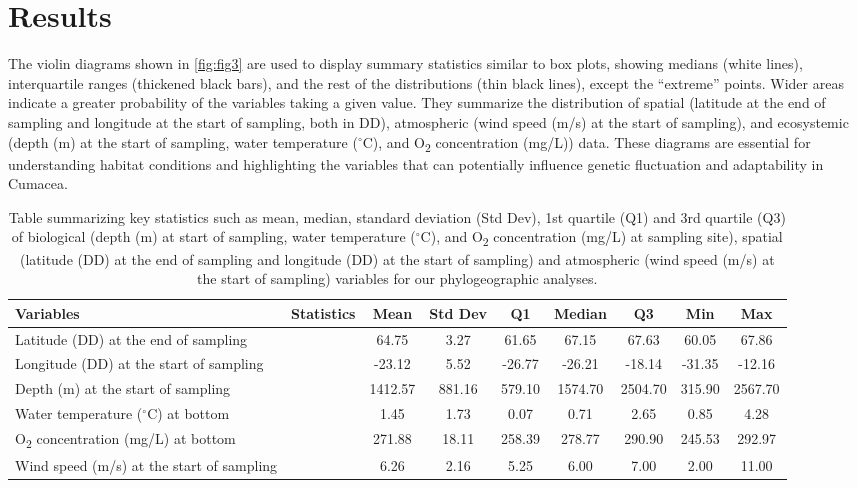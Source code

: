 \section{Results}\label{results}
The violin diagrams shown in \autoref{fig:fig3} are used to display summary statistics similar to box plots, showing medians (white lines), interquartile ranges (thickened black bars), and the rest of the distributions (thin black lines), except the ``extreme'' points. Wider areas indicate a greater probability of the variables taking a given value. They summarize the distribution of spatial (latitude at the end of sampling and longitude at the start of sampling, both in DD), atmospheric (wind speed (m/s) at the start of sampling), and ecosystemic (depth (m) at the start of sampling, water temperature ($^\circ$C), and O\textsubscript{2} concentration (mg/L)) data. These diagrams are essential for understanding habitat conditions and highlighting the variables that can potentially influence genetic fluctuation and adaptability in Cumacea. 

\begin{table}[ht]
\centering
\renewcommand{\arraystretch}{1.2}
\begin{tabular}{|l|l|c|c|c|c|c|c|c|}
\hline
\textbf{Variables} & \textbf{Statistics} & \textbf{Mean} & \textbf{Std Dev} & \textbf{Q1} & \textbf{Median} & \textbf{Q3} & \textbf{Min} & \textbf{Max} \\ \hline
Latitude (DD) at the end of sampling & & 64.75 & 3.27 & 61.65 & 67.15 & 67.63 & 60.05 & 67.86 \\ \hline
Longitude (DD) at the start of sampling & & -23.12 & 5.52 & -26.77 & -26.21 & -18.14 & -31.35 & -12.16 \\ \hline
Depth (m) at the start of sampling & & 1412.57 & 881.16 & 579.10 & 1574.70 & 2504.70 & 315.90 & 2567.70 \\ \hline
Water temperature ($^\circ$C) at bottom & & 1.45 & 1.73 & 0.07 & 0.71 & 2.65 & 0.85 & 4.28 \\ \hline
O\textsubscript{2} concentration (mg/L) at bottom & & 271.88 & 18.11 & 258.39 & 278.77 & 290.90 & 245.53 & 292.97 \\ \hline
Wind speed (m/s) at the start of sampling & & 6.26 & 2.16 & 5.25 & 6.00 & 7.00 & 2.00 & 11.00 \\ \hline
\end{tabular}
\caption{Table summarizing key statistics such as mean, median, standard deviation (Std Dev), 1st quartile (Q1) and 3rd quartile (Q3) of biological (depth (m) at start of sampling, water temperature ($^\circ$C), and O\textsubscript{2} concentration (mg/L) at sampling site), spatial (latitude (DD) at the end of sampling and longitude (DD) at the start of sampling) and atmospheric (wind speed (m/s) at the start of sampling) variables for our phylogeographic analyses. \label{fig:tab1}}
\end{table}

